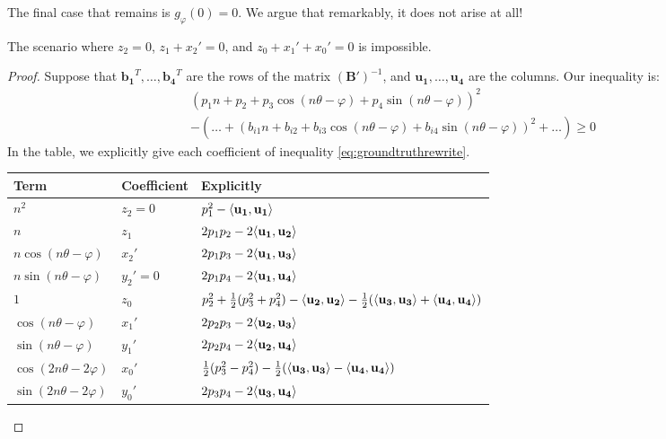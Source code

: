 The final case that remains is $g_\varphi(0) = 0$. We argue that remarkably, it does not arise at all!
\begin{lemma}
The scenario where $z_2 = 0$, $z_1 + x_2' = 0$, and $z_0 + x_1'+ x_0' = 0$ is impossible.
\end{lemma}
\begin{proof}
Suppose that $\mathbf{b_1}^T, \dots, \mathbf{b_4}^T$ are the rows of the matrix $(\mathbf{B'})^{-1}$, and $\mathbf{u_1}, \dots, \mathbf{u_4}$ are the columns. Our inequality is:
\begin{align*}
(p_1 n + p_2 + p_3\cos(n\theta - \varphi) + p_4\sin(n\theta - \varphi))^2 \\
- \left( \dots + (b_{i1} n + b_{i2} + b_{i3}\cos(n\theta - \varphi) + b_{i4}\sin(n\theta - \varphi))^2 + \dots \right) \ge 0
\end{align*}
In the table, we explicitly give each coefficient of inequality \ref{eq:groundtruthrewrite}.
\begin{table}[H]
\begin{tabular}{|l|l|l|}
  \hline
   \textbf{Term}& \textbf{Coefficient}& {\bf Explicitly} \\
  \hline
  $n^2$ & $z_2 = 0$ & $p_1^2 - \langle\mathbf{u_1}, \mathbf{u_1}\rangle$ \\
   \hline
  $n$ & $z_1$ & $2p_1p_2 - 2\langle\mathbf{u_1}, \mathbf{u_2}\rangle$ \\
   \hline
  $n\cos (n\theta - \varphi)$ & $x_2'$ & $2p_1p_3 - 2\langle\mathbf{u_1}, \mathbf{u_3}\rangle$ \\
   \hline
  $n\sin (n\theta - \varphi)$ & $y_2' = 0$ & $2p_1p_4 - 2\langle\mathbf{u_1}, \mathbf{u_4}\rangle$ \\
   \hline
  $1$ & $z_0$ & $p_2^2 + \frac{1}{2}(p_3^2 + p_4^2) - \langle\mathbf{u_2}, \mathbf{u_2}\rangle - \frac{1}{2}
 (\langle\mathbf{u_3}, \mathbf{u_3}\rangle + \langle\mathbf{u_4}, \mathbf{u_4}\rangle)$ \\
  \hline
  $\cos (n\theta-\varphi)$ & $x_1'$ & $2p_2p_3 - 2\langle\mathbf{u_2}, \mathbf{u_3}\rangle$ \\
   \hline
  $\sin (n\theta-\varphi)$ & $y_1'$ & $2p_2p_4 - 2\langle\mathbf{u_2}, \mathbf{u_4}\rangle$ \\
   \hline
  $\cos (2n\theta - 2\varphi)$ & $x_0'$ & $\frac{1}{2}(p_3^2 - p_4^2) - \frac{1}{2}(\langle\mathbf{u_3}, \mathbf{u_3}\rangle - \langle\mathbf{u_4}, \mathbf{u_4}\rangle)$ \\
   \hline
  $\sin (2n\theta - 2\varphi)$ & $y_0'$ & $2p_3p_4 - 2\langle\mathbf{u_3}, \mathbf{u_4}\rangle$ \\
  \hline
\end{tabular}

\end{table}
\end{proof}

